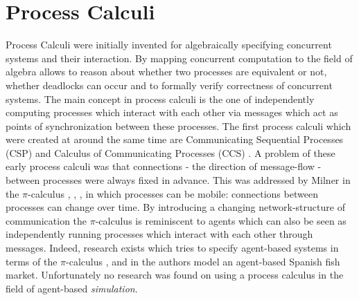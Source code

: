 \section{Process Calculi}
Process Calculi were initially invented for algebraically specifying concurrent systems and their interaction. By mapping concurrent computation to the field of algebra allows to reason about whether two processes are equivalent or not, whether deadlocks can occur and to formally verify correctness of concurrent systems. The main concept in process calculi is the one of independently computing processes which interact with each other via messages which act as points of synchronization between these processes. The first process calculi which were created at around the same time are Communicating Sequential Processes (CSP) \cite{hoare_communicating_1985} and Calculus of Communicating Processes (CCS) \cite{milner_calculus_1980}. A problem of these early process calculi was that connections - the direction of message-flow - between processes were always fixed in advance. This was addressed by Milner in the $\pi$-calculus \cite{milner_calculus_1992}, \cite{milner_calculus_1992-1}, \cite{milner_elements_1993}, \cite{milner_communicating_1999} in which processes can be mobile: connections between processes can change over time. 
By introducing a changing network-structure of communication the $\pi$-calculus is reminiscent to agents which can also be seen as independently running processes which interact with each other through messages. Indeed, research exists which tries to specify agent-based systems in terms of the $\pi$-calculus \cite{esterline_using_2001}, \cite{kawabe_nepi2programming_2000} and in \cite{padget_pi-calculus_1998} the authors model an agent-based Spanish fish market. Unfortunately no research was found on using a process calculus in the field of agent-based \textit{simulation}.